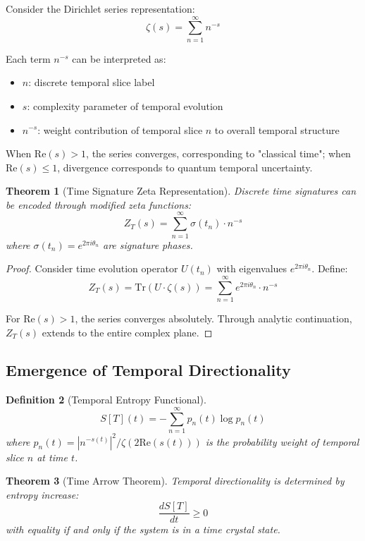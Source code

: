 \documentclass[12pt]{article}
\newtheorem{theorem}{Theorem}[section]
\newtheorem{definition}[theorem]{Definition}
\begin{document}
Consider the Dirichlet series representation:
$$\zeta(s) = \sum_{n=1}^{\infty} n^{-s}$$

Each term $n^{-s}$ can be interpreted as:
\begin{itemize}
\item $n$: discrete temporal slice label
\item $s$: complexity parameter of temporal evolution
\item $n^{-s}$: weight contribution of temporal slice $n$ to overall temporal structure
\end{itemize}

When $\text{Re}(s) > 1$, the series converges, corresponding to "classical time"; when $\text{Re}(s) \leq 1$, divergence corresponds to quantum temporal uncertainty.

\begin{theorem}[Time Signature Zeta Representation]
Discrete time signatures can be encoded through modified zeta functions:
$$Z_T(s) = \sum_{n=1}^{\infty} \sigma(t_n) \cdot n^{-s}$$
where $\sigma(t_n) = e^{2\pi i \theta_n}$ are signature phases.
\end{theorem}

\begin{proof}
Consider time evolution operator $U(t_n)$ with eigenvalues $e^{2\pi i \theta_n}$. Define:
$$Z_T(s) = \text{Tr}(U \cdot \zeta(s)) = \sum_{n=1}^{\infty} e^{2\pi i \theta_n} \cdot n^{-s}$$

For $\text{Re}(s) > 1$, the series converges absolutely. Through analytic continuation, $Z_T(s)$ extends to the entire complex plane.
\end{proof}

\subsection{Emergence of Temporal Directionality}

\begin{definition}[Temporal Entropy Functional]
$$S[T](t) = -\sum_{n=1}^{\infty} p_n(t) \log p_n(t)$$
where $p_n(t) = |n^{-s(t)}|^2 / \zeta(2\text{Re}(s(t)))$ is the probability weight of temporal slice $n$ at time $t$.
\end{definition}

\begin{theorem}[Time Arrow Theorem]
Temporal directionality is determined by entropy increase:
$$\frac{dS[T]}{dt} \geq 0$$
with equality if and only if the system is in a time crystal state.
\end{theorem}
\end{document}
